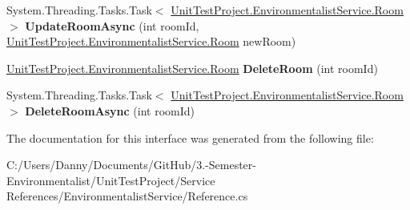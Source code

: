 \begin{DoxyCompactItemize}
\item 
\hypertarget{interface_unit_test_project_1_1_environmentalist_service_1_1_i_service1_ad5220133d576d4e1eb1dd8844e8e257a}{}System.\+Threading.\+Tasks.\+Task$<$ \hyperlink{class_unit_test_project_1_1_environmentalist_service_1_1_room}{Unit\+Test\+Project.\+Environmentalist\+Service.\+Room} $>$ {\bfseries Update\+Room\+Async} (int room\+Id, \hyperlink{class_unit_test_project_1_1_environmentalist_service_1_1_room}{Unit\+Test\+Project.\+Environmentalist\+Service.\+Room} new\+Room)\label{interface_unit_test_project_1_1_environmentalist_service_1_1_i_service1_ad5220133d576d4e1eb1dd8844e8e257a}

\item 
\hypertarget{interface_unit_test_project_1_1_environmentalist_service_1_1_i_service1_a3f1b7ed171987013694ff42ed2134005}{}\hyperlink{class_unit_test_project_1_1_environmentalist_service_1_1_room}{Unit\+Test\+Project.\+Environmentalist\+Service.\+Room} {\bfseries Delete\+Room} (int room\+Id)\label{interface_unit_test_project_1_1_environmentalist_service_1_1_i_service1_a3f1b7ed171987013694ff42ed2134005}

\item 
\hypertarget{interface_unit_test_project_1_1_environmentalist_service_1_1_i_service1_a1b9a2aa5327767812facbf47f65a4306}{}System.\+Threading.\+Tasks.\+Task$<$ \hyperlink{class_unit_test_project_1_1_environmentalist_service_1_1_room}{Unit\+Test\+Project.\+Environmentalist\+Service.\+Room} $>$ {\bfseries Delete\+Room\+Async} (int room\+Id)\label{interface_unit_test_project_1_1_environmentalist_service_1_1_i_service1_a1b9a2aa5327767812facbf47f65a4306}

\end{DoxyCompactItemize}


The documentation for this interface was generated from the following file\+:\begin{DoxyCompactItemize}
\item 
C\+:/\+Users/\+Danny/\+Documents/\+Git\+Hub/3.-\/\+Semester-\/\+Environmentalist/\+Unit\+Test\+Project/\+Service References/\+Environmentalist\+Service/Reference.\+cs\end{DoxyCompactItemize}
